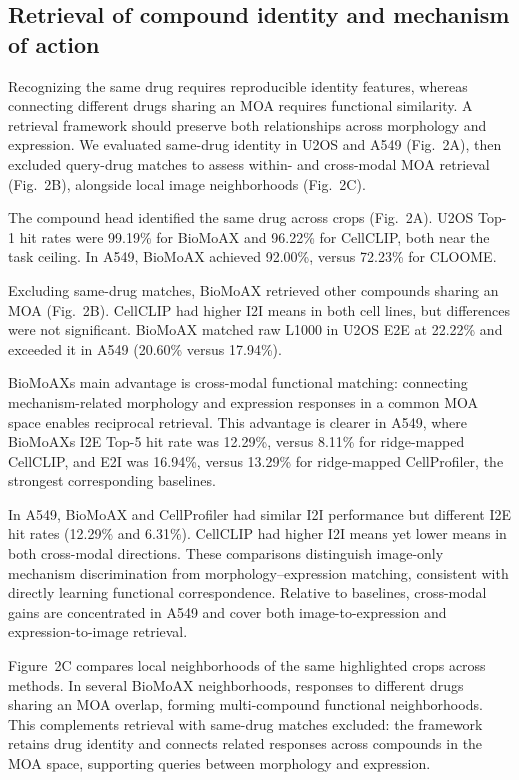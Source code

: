 \subsection{Retrieval of compound identity and mechanism of action}
Recognizing the same drug requires reproducible identity features, whereas connecting different drugs sharing an MOA requires functional similarity. A retrieval framework should preserve both relationships across morphology and expression. We evaluated same-drug identity in U2OS and A549 (Fig.~2A), then excluded query-drug matches to assess within- and cross-modal MOA retrieval (Fig.~2B), alongside local image neighborhoods (Fig.~2C).


The compound head identified the same drug across crops (Fig.~2A). U2OS Top-1 hit rates were 99.19\% for BioMoAX and 96.22\% for CellCLIP, both near the task ceiling. In A549, BioMoAX achieved 92.00\%, versus 72.23\% for CLOOME.

Excluding same-drug matches, BioMoAX retrieved other compounds sharing an MOA (Fig.~2B). CellCLIP had higher I2I means in both cell lines, but differences were not significant. BioMoAX matched raw L1000 in U2OS E2E at 22.22\% and exceeded it in A549 (20.60\% versus 17.94\%).

BioMoAX\textquotesingle s main advantage is cross-modal functional matching: connecting mechanism-related morphology and expression responses in a common MOA space enables reciprocal retrieval. This advantage is clearer in A549, where BioMoAX\textquotesingle s I2E Top-5 hit rate was 12.29\%, versus 8.11\% for ridge-mapped CellCLIP, and E2I was 16.94\%, versus 13.29\% for ridge-mapped CellProfiler, the strongest corresponding baselines.

In A549, BioMoAX and CellProfiler had similar I2I performance but different I2E hit rates (12.29\% and 6.31\%). CellCLIP had higher I2I means yet lower means in both cross-modal directions. These comparisons distinguish image-only mechanism discrimination from morphology--expression matching, consistent with directly learning functional correspondence. Relative to baselines, cross-modal gains are concentrated in A549 and cover both image-to-expression and expression-to-image retrieval.

Figure~2C compares local neighborhoods of the same highlighted crops across methods. In several BioMoAX neighborhoods, responses to different drugs sharing an MOA overlap, forming multi-compound functional neighborhoods. This complements retrieval with same-drug matches excluded: the framework retains drug identity and connects related responses across compounds in the MOA space, supporting queries between morphology and expression.

